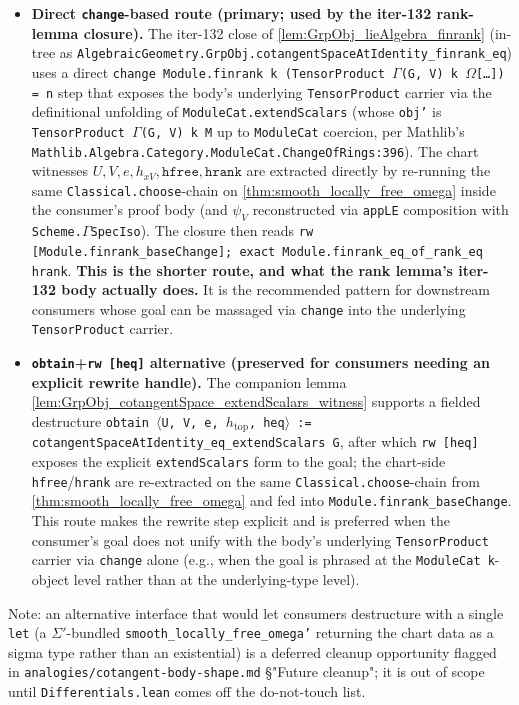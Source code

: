 \begin{itemize}
  \item \textbf{Direct \texttt{change}-based route (primary; used by the iter-132 rank-lemma closure).} The iter-132 close of \cref{lem:GrpObj_lieAlgebra_finrank} (in-tree as \texttt{AlgebraicGeometry.GrpObj.cotangentSpaceAtIdentity\_finrank\_eq}) uses a direct \texttt{change Module.finrank k (TensorProduct \(\Gamma\)(G, V) k \(\Omega\)[\ldots]) = n} step that exposes the body's underlying \texttt{TensorProduct} carrier via the definitional unfolding of \texttt{ModuleCat.extendScalars} (whose \texttt{obj'} is \texttt{TensorProduct \(\Gamma\)(G, V) k M} up to \texttt{ModuleCat} coercion, per Mathlib's \texttt{Mathlib.Algebra.Category.ModuleCat.ChangeOfRings:396}). The chart witnesses \(U, V, e, h_{xV}, \texttt{hfree}, \texttt{hrank}\) are extracted directly by re-running the same \texttt{Classical.choose}-chain on \cref{thm:smooth_locally_free_omega} inside the consumer's proof body (and \(\psi_V\) reconstructed via \texttt{appLE} composition with \texttt{Scheme.\(\Gamma\)SpecIso}). The closure then reads \texttt{rw [Module.finrank\_baseChange]; exact Module.finrank\_eq\_of\_rank\_eq hrank}. \textbf{This is the shorter route, and what the rank lemma's iter-132 body actually does.} It is the recommended pattern for downstream consumers whose goal can be massaged via \texttt{change} into the underlying \texttt{TensorProduct} carrier.
  \item \textbf{\texttt{obtain}+\texttt{rw [heq]} alternative (preserved for consumers needing an explicit rewrite handle).} The companion lemma \cref{lem:GrpObj_cotangentSpace_extendScalars_witness} supports a fielded destructure \texttt{obtain \(\langle\)U, V, e, \(h_\mathrm{top}\), heq\(\rangle\) := cotangentSpaceAtIdentity\_eq\_extendScalars G}, after which \texttt{rw [heq]} exposes the explicit \texttt{extendScalars} form to the goal; the chart-side \texttt{hfree}/\texttt{hrank} are re-extracted on the same \texttt{Classical.choose}-chain from \cref{thm:smooth_locally_free_omega} and fed into \texttt{Module.finrank\_baseChange}. This route makes the rewrite step explicit and is preferred when the consumer's goal does not unify with the body's underlying \texttt{TensorProduct} carrier via \texttt{change} alone (e.g., when the goal is phrased at the \texttt{ModuleCat k}-object level rather than at the underlying-type level).
\end{itemize}

Note: an alternative interface that would let consumers destructure with a single \texttt{let} (a \texttt{\(\Sigma'\)}-bundled \texttt{smooth\_locally\_free\_omega'} returning the chart data as a sigma type rather than an existential) is a deferred cleanup opportunity flagged in \texttt{analogies/cotangent-body-shape.md} \S "Future cleanup"; it is out of scope until \texttt{Differentials.lean} comes off the do-not-touch list.

